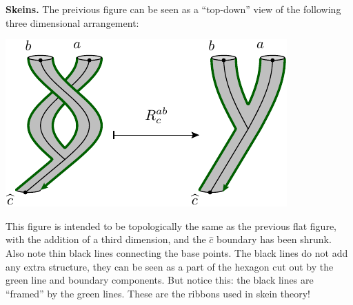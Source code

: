 \documentclass[aps, prl, letterpaper, twocolumn, superscriptaddress, notitlepage, 10pt]{revtex4-1}
\newcommand{\F}{\mathscr{H}} %
\newcommand{\subsub}[1]{{\bf #1}}
\begin{document}
\subsub{Skeins.}
The preivious figure can be seen as a ``top-down'' view of the
following three dimensional arrangement:
\begin{center}
\includegraphics[]{pic-rmove-skein.pdf}
\end{center}
This figure is intended to be topologically
the same as the previous flat figure,
with the addition of a third dimension,
and the $\widehat{c}$ boundary has been shrunk.
Also note thin black lines
connecting the base points.
The black lines do not add any extra structure, they can
be seen as a part of the hexagon cut out by
the green line and boundary components.
But notice this: the black lines are ``framed'' by the green lines. 
These are the ribbons used in skein theory!

\end{document}
